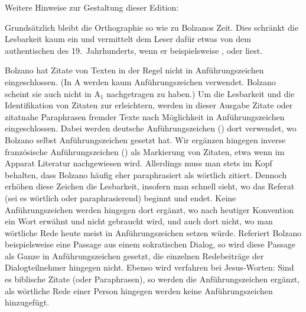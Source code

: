 Weitere Hinweise zur Gestaltung dieser Edition:
\begin{aufza}
\item Grundsätzlich bleibt die Orthographie so wie zu Bolzanos Zeit. Dies schränkt die Lesbarkeit kaum ein und vermittelt dem Leser dafür etwas von dem authentischen  des 19.~Jahrhunderts, wenn er beispielsweise ,  oder  liest. 
\item Bolzano hat Zitate von Texten in der Regel nicht in Anführungszeichen eingeschlossen. (In A werden kaum Anführungszeichen verwendet. Bolzano scheint sie auch nicht in A$_1$ nachgetragen zu haben.) Um die Lesbarkeit und die Identifikation von Zitaten zur erleichtern, werden in dieser Ausgabe Zitate oder zitatnahe Paraphrasen fremder Texte nach Möglichkeit in Anführungszeichen eingeschlossen. Dabei werden deutsche Anführungszeichen (\eanf{\ }) dort verwendet, wo Bolzano selbst Anführungszeichen gesetzt hat. Wir ergänzen hingegen inverse französische Anführungszeichen (\erganf{\ }) als Markierung von Zitaten, etwa wenn im Apparat Literatur nachgewiesen wird. Allerdings muss man stets im Kopf behalten, dass Bolzano häufig eher paraphrasiert als wörtlich zitiert. Dennoch erhöhen diese Zeichen die Lesbarkeit, insofern man schnell sieht, wo das Referat (sei es wörtlich oder paraphrasierend) beginnt und endet. Keine Anführungszeichen werden hingegen dort ergänzt, wo nach heutiger Konvention ein Wort erwähnt und nicht gebraucht wird, und auch dort nicht, wo man wörtliche Rede heute meist in Anführungszeichen setzen würde. Referiert Bolzano beispielsweise eine Passage aus einem sokratischen Dialog, so wird diese Passage als Ganze in Anführungszeichen gesetzt, die einzelnen Redebeiträge der Dialogteilnehmer hingegen nicht. Ebenso wird verfahren bei Jesus-Worten: Sind es biblische Zitate (oder Paraphrasen), so werden die Anführungszeichen \erganf{\ } ergänzt, als wörtliche Rede einer Person hingegen werden keine Anführungszeichen hinzugefügt.

\end{aufza}
